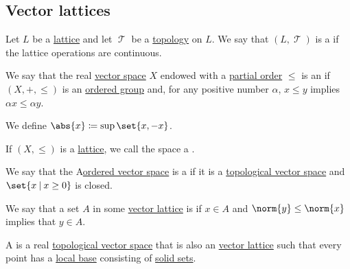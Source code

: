 \subsection{Vector lattices}\label{subsec:vector_lattices}

\begin{definition}\label{def:topological_lattice}
  Let \( L \) be a \hyperref[def:semilattice/lattice]{lattice} and let \( \mscrT \) be a \hyperref[def:topological_space]{topology} on \( L \). We say that \( (L, \mscrT) \) is a  if the lattice operations are continuous.
\end{definition}

\begin{definition}\label{def:ordered_vector_space}
  We say that the real \hyperref[def:vector_space]{vector space} \( X \) endowed with a \hyperref[def:partially_ordered_set]{partial order} \( \leq \) is an  if \( (X, +, \leq) \) is an \hyperref[def:ordered_magma]{ordered group} and, for any positive number \( \alpha \), \( x \leq y \) implies \( \alpha x \leq \alpha y \).

  We define \( \abs{x} \coloneqq \sup\set{x, -x} \).

  If \( (X, \leq) \) is a \hyperref[def:semilattice/lattice]{lattice}, we call the space a .
\end{definition}

\begin{definition}\label{def:ordered_topological_vector_space}
  We say that the A\hyperref[def:ordered_vector_space]{ordered vector space} is a  if it is a \hyperref[def:topological_vector_space]{topological vector space} and \( \set{ x \given x \geq 0 } \) is closed.
\end{definition}

\begin{definition}\label{def:solid_set}
  We say that a set \( A \) in some \hyperref[def:ordered_vector_space]{vector lattice} is  if \( x \in A \) and \( \norm{y} \leq \norm{x} \) implies that \( y \in A \).
\end{definition}

\begin{definition}\label{def:topological_vector_lattice}
  A  is a real \hyperref[def:topological_vector_space]{topological vector space} that is also an \hyperref[def:ordered_vector_space]{vector lattice} such that every point has a \hyperref[def:topological_local_base]{local base} consisting of \hyperref[def:solid_set]{solid sets}.
\end{definition}

